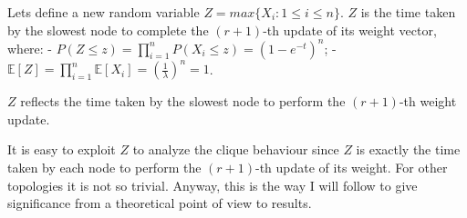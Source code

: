 \documentclass[11pt]{article}
\begin{document}
Lets define a new random variable \(Z = max\{X_i : 1 \leq i \leq n\}\).
\(Z\) is the time taken by the slowest node to complete the \((r+1)\)-th
update of its weight vector, where: -
\(P(Z \leq z) = \prod_{i=1}^{n} P(X_i \leq z) = (1-e^{-t})^n\); -
\(\mathbb{E}[Z] = \prod_{i=1}^{n} \mathbb{E}[X_i] = (\frac{1}{\lambda})^n = 1\).

\(Z\) reflects the time taken by the slowest node to perform the
\((r+1)\)-th weight update.

It is easy to exploit \(Z\) to analyze the clique behaviour since \(Z\)
is exactly the time taken by each node to perform the \((r+1)\)-th
update of its weight. For other topologies it is not so trivial. Anyway,
this is the way I will follow to give significance from a theoretical
point of view to results.


    
    
    
    
\end{document}
